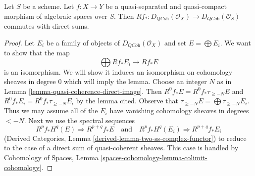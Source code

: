 \begin{lemma}
\label{lemma-quasi-coherence-pushforward-direct-sums}
Let $S$ be a scheme. Let $f : X \to Y$ be a quasi-separated and
quasi-compact morphism of algebraic spaces over $S$. Then
$Rf_* : D_{\textit{QCoh}}(\mathcal{O}_X) \to D_{\textit{QCoh}}(\mathcal{O}_S)$
commutes with direct sums.
\end{lemma}

\begin{proof}
Let $E_i$ be a family of objects of $D_{\textit{QCoh}}(\mathcal{O}_X)$
and set $E = \bigoplus E_i$. We want to show that the map
$$
\bigoplus Rf_*E_i \longrightarrow Rf_*E
$$
is an isomorphism. We will show it induces an isomorphism on
cohomology sheaves in degree $0$ which will imply the lemma.
Choose an integer $N$ as in Lemma \ref{lemma-quasi-coherence-direct-image}.
Then $R^0f_*E = R^0f_*\tau_{\geq -N}E$ and
$R^0f_*E_i = R^0f_*\tau_{\geq -N}E_i$ by the lemma cited. Observe that
$\tau_{\geq -N}E = \bigoplus \tau_{\geq -N}E_i$.
Thus we may assume all of the $E_i$ have vanishing cohomology
sheaves in degrees $< -N$. Next we use the spectral sequences
$$
R^pf_*H^q(E) \Rightarrow R^{p + q}f_*E
\quad\text{and}\quad
R^pf_*H^q(E_i) \Rightarrow R^{p + q}f_*E_i
$$
(Derived Categories, Lemma \ref{derived-lemma-two-ss-complex-functor})
to reduce to the case of a direct sum of quasi-coherent sheaves.
This case is handled by
Cohomology of Spaces, Lemma \ref{spaces-cohomology-lemma-colimit-cohomology}.
\end{proof}

